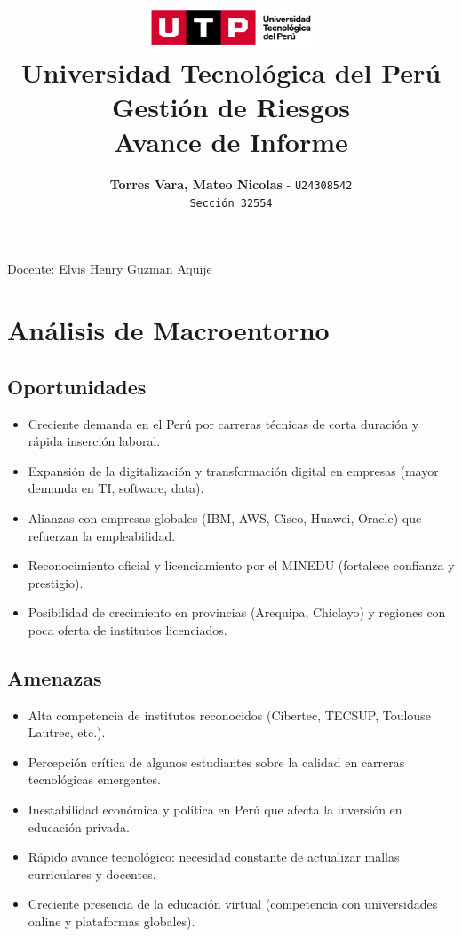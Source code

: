 \documentclass[12pt]{article}
\title{
  \vspace{2cm}
  \pagenumbering{gobble}
  \includegraphics[width=5cm]{./assets/logo-utp.png} \\
  \vspace{1cm}
  \textbf{Universidad Tecnológica del Perú} \\
  \vspace{2cm}
  \textbf{Gestión de Riesgos} \\
  \vspace{1cm}
  \large \textbf{Avance de Informe}
}
\author{
  \textbf{Torres Vara, Mateo Nicolas} - \texttt{U24308542} \\
  \texttt{Sección 32554}
}
\begin{document}
\maketitle
\begin{center}

  Docente: Elvis Henry Guzman Aquije

\end{center}

%
%

\newpage
\section*{Análisis de Macroentorno}

\subsection*{Oportunidades}
\begin{itemize}
  \item Creciente demanda en el Perú por carreras técnicas de corta duración y rápida inserción laboral.
  \item Expansión de la digitalización y transformación digital en empresas (mayor demanda en TI, software, data).
  \item Alianzas con empresas globales (IBM, AWS, Cisco, Huawei, Oracle) que refuerzan la empleabilidad.
  \item Reconocimiento oficial y licenciamiento por el MINEDU (fortalece confianza y prestigio).
  \item Posibilidad de crecimiento en provincias (Arequipa, Chiclayo) y regiones con poca oferta de institutos licenciados.
\end{itemize}

\subsection*{Amenazas}
\begin{itemize}
  \item Alta competencia de institutos reconocidos (Cibertec, TECSUP, Toulouse Lautrec, etc.).
  \item Percepción crítica de algunos estudiantes sobre la calidad en carreras tecnológicas emergentes.
  \item Inestabilidad económica y política en Perú que afecta la inversión en educación privada.
  \item Rápido avance tecnológico: necesidad constante de actualizar mallas curriculares y docentes.
  \item Creciente presencia de la educación virtual (competencia con universidades online y plataformas globales).
\end{itemize}
\end{document}
